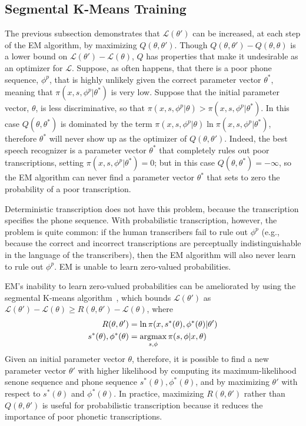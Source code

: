 \subsection{Segmental K-Means Training}

The previous subsection demonstrates that ${\mathcal L}(\theta')$ can
be increased, at each step of the EM algorithm, by maximizing
$Q(\theta,\theta')$.  Though $Q(\theta,\theta')-Q(\theta,\theta)$ is a
lower bound on ${\mathcal L}(\theta')-{\mathcal L}(\theta)$, $Q$
has properties that make it undesirable as an optimizer for ${\mathcal
  L}$.  Suppose, as often happens, that there is a poor phone
sequence, $\phi^p$, that is highly unlikely given the correct
parameter vector $\theta^*$, meaning that $\pi(x,s,\phi^p|\theta^*)$
is very low.  Suppose that the initial parameter vector, $\theta$, is
less discriminative, so that
$\pi(x,s,\phi^p|\theta)>\pi(x,s,\phi^p|\theta^*)$.  In this case
$Q(\theta,\theta^*)$ is dominated by the term
$\pi(x,s,\phi^p|\theta)\ln\pi(x,s,\phi^p|\theta^*)$, therefore
$\theta^*$ will never show up as the optimizer of $Q(\theta,\theta')$.
Indeed, the best speech recognizer is a parameter vector $\theta^*$
that completely rules out poor transcriptions, setting
$\pi(x,s,\phi^p|\theta^*)=0$; but in this case
$Q(\theta,\theta^*)=-\infty$, so the EM algorithm can never find a
parameter vector $\theta^*$ that sets to zero the probability of a
poor transcription.

Deterministic transcription does not have this problem, because the
transcription specifies the phone sequence.  With probabilistic
transcription, however, the problem is quite common: if the
human transcribers fail to rule out $\phi^p$ (e.g., because the
correct and incorrect transcriptions are perceptually
indistinguishable in the language of the transcribers), then the EM
algorithm will also never learn to rule out $\phi^p$.  EM is unable
to learn zero-valued probabilities.

EM's inability to learn zero-valued probabilities can be ameliorated
by using the segmental K-means algorithm~\cite{Juang1990}, which
bounds ${\mathcal L}(\theta')$ as
$\mathcal{L}(\theta')-\mathcal{L}(\theta)\ge
R(\theta,\theta')-\mathcal{L}(\theta)$, where
\begin{align}
  R(\theta,\theta') &= \ln \pi(x,s^*(\theta),\phi^*(\theta)|\theta')\\
  s^*(\theta),\phi^*(\theta)&= \operatorname*{argmax}_{s,\phi} \pi(s,\phi|x,\theta)
\end{align}
Given an initial parameter vector $\theta$, therefore, it is possible
to find a new parameter vector $\theta'$ with higher likelihood by
computing its maximum-likelihood senone sequence and phone sequence
$s^*(\theta),\phi^*(\theta)$, and by maximizing $\theta'$ with respect to
$s^*(\theta)$ and $\phi^*(\theta)$.
In practice, maximizing
$R(\theta,\theta')$ rather than $Q(\theta,\theta')$ is useful for
probabilistic transcription because it reduces the importance of poor
phonetic transcriptions.
